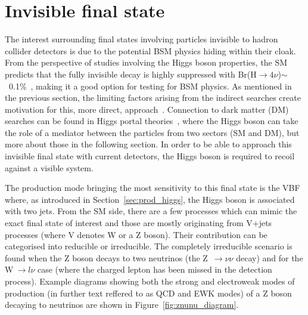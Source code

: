 \section{Invisible final state}
\hspace{10pt} The interest surrounding final states involving particles invisible to hadron collider detectors is due to the potential BSM physics hiding within their cloak. From the perspective of studies involving the Higgs boson properties, the SM predicts that the fully invisible decay is highly suppressed with Br(H$\rightarrow4\nu$)$\sim$~0.1\%~\cite{report_lhcxswg_3}, making it a good option for testing for BSM physics. As mentioned in the previous section, the limiting factors arising from the indirect searches create motivation for this, more direct, approach~\cite{paper:hinv_run1,paper:HIG_17_023,Patrick,Riccardo}. Connection to dark matter (DM) searches can be found in Higgs portal theories~\cite{paper:hig_portal_models1,paper:hig_portal_models2,paper:hig_portal_models3,paper:hig_portal_models4}, where the Higgs boson can take the role of a mediator between the particles from two sectors (SM and DM), but more about those in the following section. In order to be able to approach this invisible final state with current detectors, the Higgs boson is required to recoil against a visible system.

\hspace{10pt} The production mode bringing the most sensitivity to this final state is the VBF where, as introduced in Section~\ref{sec:prod_higgs}, the Higgs boson is associated with two jets. From the SM side, there are a few processes which can mimic the exact final state of interest and those are mostly originating from V+jets processes (where V denotes W or a Z boson). Their contribution can be categorised into reducible or irreducible. The completely irreducible scenario is found when the Z boson decays to two neutrinos (the Z~$\rightarrow\nu\nu$ decay) and for the W$~\rightarrow l\nu$ case (where the charged lepton has been missed in the detection process). Example diagrams showing both the strong and electroweak modes of production (in further text reffered to as QCD and EWK modes) of a Z boson decaying to neutrinos are shown in Figure~\ref{fig:znunu_diagram}. 


